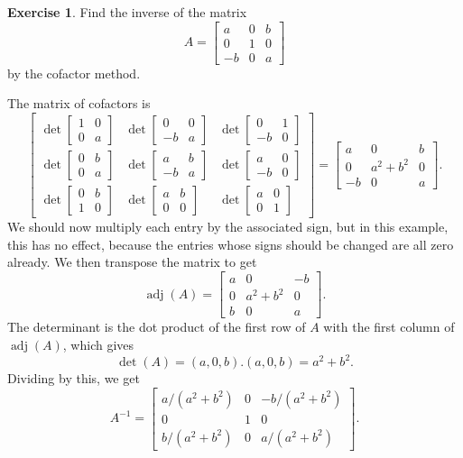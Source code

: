 \documentclass[a4paper]{book}
\newcommand{\bbm}       {\begin{bmatrix}}
\newcommand{\ebm}       {\end{bmatrix}}
\newcommand{\adj}       {\operatorname{adj}}
\renewcommand{\:}{\colon}
\theoremstyle{definition}
\newtheorem{exercise}[theorem]{Exercise}
\renewenvironment{solution}{\SolutionInline}{\endSolutionInline}
\begin{document}
\begin{exercise}
 Find the inverse of the matrix
 \[ A = \bbm a&0&b\\ 0&1&0\\ -b&0&a \ebm \]
 by the cofactor method.
\end{exercise}
\begin{solution}
 The matrix of cofactors is
 \[ \bbm 
     \det\bbm 1&0\\  0&a\ebm &
     \det\bbm 0&0\\ -b&a\ebm &
     \det\bbm 0&1\\ -b&0\ebm \\
     \det\bbm 0&b\\  0&a\ebm &
     \det\bbm a&b\\ -b&a\ebm &
     \det\bbm a&0\\ -b&0\ebm \\
     \det\bbm 0&b\\  1&0\ebm &
     \det\bbm a&b\\  0&0\ebm &
     \det\bbm a&0\\  0&1\ebm 
    \ebm = 
    \bbm a & 0 & b \\
         0 & a^2+b^2 & 0 \\ 
         -b & 0 & a \ebm.
 \]
 We should now multiply each entry by the associated sign, but in this
 example, this has no effect, because the entries whose signs should
 be changed are all zero already.  We then transpose the matrix to get 
 \[ \adj(A) = \bbm a&0&-b \\ 0&a^2+b^2&0 \\ b&0&a \ebm. \]
 The determinant is the dot product of the first row of $A$ with the
 first column of $\adj(A)$, which gives
 \[ \det(A) = (a,0,b).(a,0,b) = a^2+b^2. \] 
 Dividing by this, we get
 \[ A^{-1} =
     \bbm a/(a^2+b^2) & 0 & -b/(a^2+b^2) \\
          0           & 1 &  0 \\ 
          b/(a^2+b^2) & 0 &  a/(a^2+b^2) \ebm.
 \]
\end{solution}
\end{document}
